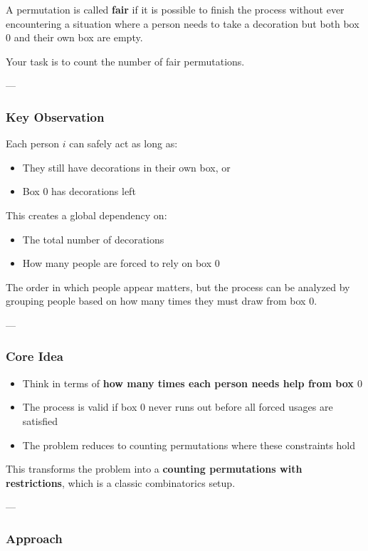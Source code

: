 \documentclass[11pt]{article}
\begin{document}
A permutation is called \textbf{fair} if it is possible to finish the process
without ever encountering a situation where a person needs to take a decoration
but both box $0$ and their own box are empty.

Your task is to count the number of fair permutations.

---

\subsubsection{Key Observation}

Each person $i$ can safely act as long as:
\begin{itemize}
    \item They still have decorations in their own box, or
    \item Box $0$ has decorations left
\end{itemize}

This creates a global dependency on:
\begin{itemize}
    \item The total number of decorations
    \item How many people are forced to rely on box $0$
\end{itemize}

The order in which people appear matters, but the process can be analyzed
by grouping people based on how many times they must draw from box $0$.

---

\subsubsection{Core Idea}

\begin{itemize}
    \item Think in terms of \textbf{how many times each person needs help from box $0$}
    \item The process is valid if box $0$ never runs out before all forced usages are satisfied
    \item The problem reduces to counting permutations where these constraints hold
\end{itemize}

This transforms the problem into a \textbf{counting permutations with restrictions},
which is a classic combinatorics setup.

---

\subsubsection{Approach}
\end{document}
